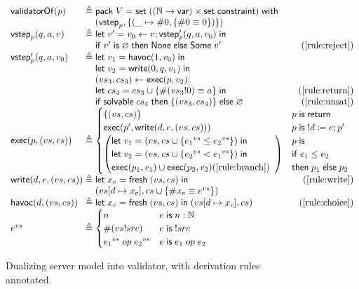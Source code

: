 \begin{figure}
\[\begin{array}{l@{\;}r@{\;}l}
\validatorOf(p)&\triangleq&\existT{V}{\Set((\Nat\to\Var)\times\Set\constraint)}{\\
  &&(\vstep_p,\{(\_\mapsto\#0,\{\#0\equiv0\})\})}\\
\vstep_p(q,a,v)&\triangleq&\letin{v'}{v_0\gets v;\vstep'_p(q,a,v_0)}\\
&&\If v'\Is\varnothing\Then\None\Else\Some v'\hfill(\ref{rule:reject})\\
\vstep'_p(q,a,v_0)&\triangleq&\letin{v_1}{\Havoc(1,v_0)}\\
&&\letin{v_2}{\Write(0,q,v_1)}\\
&&(vs_3,cs_3)\gets\Exec(p,v_2);\\
&&\letin{cs_4}{cs_3\cup\{\#(vs_3!0)\equiv a\}}\hfill(\ref{rule:return})\\
&&\If\solvable cs_4\Then\{(vs_3,cs_4)\}\Else\varnothing\hfill(\ref{rule:unsat})\\
\Exec(p,(vs,cs))&\triangleq&\begin{cases}
  \{(vs,cs)\}&p\Is\Return\\
  \Exec(p',\Write(d,e,(vs,cs)))&p\Is !d\coloneqq e;p'\\
  \left(\begin{array}{@{}l}
    \letin{v_1}{(vs,cs\cup\{{e_1}^{vs}\le{e_2}^{vs}\})}\\
    \letin{v_2}{(vs,cs\cup\{{e_2}^{vs}<{e_1}^{vs}\})}\\
    \Exec(p_1,v_1)\cup\Exec(p_2,v_2)\hfill(\ref{rule:branch})
  \end{array}\right)&\begin{array}{@{}l}p\Is\\
    \If e_1\le e_2\\
    \tthen p_1\Else p_2\end{array}
\end{cases}\\
\Write(d,e,(vs,cs))&\triangleq&\letin{x_e}{\Fresh (vs,cs)}\hfill(\ref{rule:write})\\
&&(\update{vs}{d}{x_e},cs\cup\{\#x_e\equiv e^{vs}\})\\
\Havoc(d,(vs,cs))&\triangleq&\letin{x_c}{\Fresh (vs,cs)}(\update{vs}{d}{x_c},cs)\hfill(\ref{rule:choice})\\
e^{vs}&\triangleq&\begin{cases}
  n&e\Is n:\Nat\\
  \#(vs!src)&e\Is!src\\
  {e_1}^{vs}\oop{e_2}^{vs}&e\Is e_1\oop e_2
\end{cases}
\end{array}\]
\caption[Dualizing server model into validator]{Dualizing server model into
  validator, with derivation rules annotated.}
\label{fig:dualize}
\end{figure}

